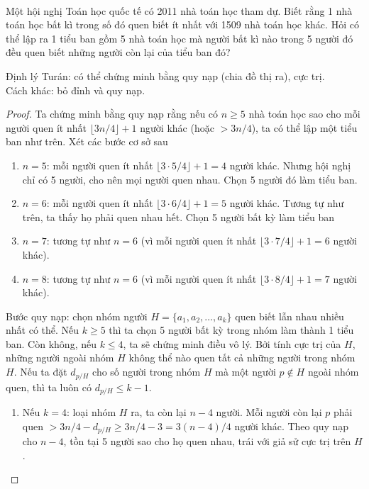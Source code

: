 \documentclass{treatise}
\begin{document}
\ \\
\begin{exercise}
Một hội nghị Toán học quốc tế có 2011 nhà toán học tham dự. Biết rằng 1 nhà toán học bất kì trong số đó quen biết ít nhất với 1509 nhà toán học khác. Hỏi có thể lập ra 1 tiểu ban gồm 5 nhà toán học mà người bất kì nào trong 5 người đó đều quen biết những người còn lại của tiểu ban đó?  
\end{exercise}
\begin{remark}
Định lý Turán: có thể chứng minh bằng quy nạp (chia đồ thị ra), cực trị.
\\
Cách khác: bỏ đỉnh và quy nạp.
\end{remark}
\begin{proof}
Ta chứng minh bằng quy nạp rằng nếu có $n \geq 5$ nhà toán học sao cho mỗi người quen ít nhất $\lfloor 3n/4 \rfloor + 1$ người khác (hoặc $> 3n/4$), ta có thể lập một tiểu ban như trên. Xét các bước cơ sở sau
\begin{enumerate}
	\item $n = 5$: mỗi người quen ít nhất $\lfloor 3 \cdot 5/4 \rfloor + 1 = 4$ người khác. Nhưng hội nghị chỉ có 5 người, cho nên mọi người quen nhau. Chọn 5 người đó làm tiểu ban.
	\item $n = 6$: mỗi người quen ít nhất $\lfloor 3 \cdot 6/4 \rfloor + 1 = 5$ người khác. Tương tự như trên, ta thấy họ phải quen nhau hết. Chọn 5 người bất kỳ làm tiểu ban
	\item $n = 7$: tương tự như $n = 6$ (vì mỗi người quen ít nhất $\lfloor 3 \cdot 7/4 \rfloor + 1 = 6$ người khác).
	\item $n = 8$: tương tự như $n = 6$ (vì mỗi người quen ít nhất $\lfloor 3 \cdot 8/4 \rfloor + 1 = 7$ người khác).
\end{enumerate}
Bước quy nạp: chọn nhóm người $H = \{ a_1, a_2, \hdots, a_k \}$ quen biết lẫn nhau nhiều nhất có thể. Nếu $k \geq 5$ thì ta chọn 5 người bất kỳ trong nhóm làm thành 1 tiểu ban. Còn không, nếu $k \leq 4$, ta sẽ chứng minh điều vô lý. Bởi tính cực trị của $H$, những người ngoài nhóm $H$ không thể nào quen tất cả những người trong nhóm $H$. Nếu ta đặt $d_{p/H}$ cho số người trong nhóm $H$ mà một người $p \notin H$ ngoài nhóm quen, thì ta luôn có $d_{p/H} \leq k - 1$.
\begin{enumerate}
	\item Nếu $k = 4$: loại nhóm $H$ ra, ta còn lại $n - 4$ người. Mỗi người còn lại $p$ phải quen $> 3n/4 - d_{p/H} \geq 3n/4 - 3 = 3(n-4)/4$ người khác. Theo quy nạp cho $n-4$, tồn tại 5 người sao cho họ quen nhau, trái với giả sử cực trị trên $H$.

\end{enumerate}
\end{proof}
\end{document}
